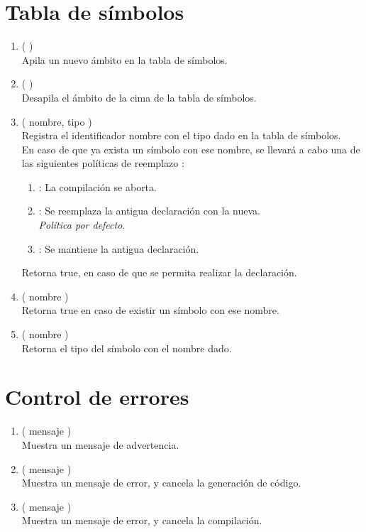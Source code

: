 \section{Tabla de símbolos}

\begin{enumerate}

	\item {} ( ) \\
			Apila un nuevo ámbito en la tabla de símbolos.
			
	\item {} ( ) \\
			Desapila el ámbito de la cima de la tabla de símbolos.

	\item {} ( nombre, tipo ) \\
			Registra el identificador nombre con el tipo dado en la tabla de símbolos.\\
			En caso de que ya exista un símbolo con ese nombre, se llevará a cabo una de las siguientes políticas de reemplazo :
				\begin{enumerate}
				
					\item {}: La compilación se aborta.
					
					\item {}: Se reemplaza la antigua declaración con la nueva. \\
						  \emph{Política por defecto}.
					
					\item {}: Se mantiene la antigua declaración.
					
				\end{enumerate}
			Retorna true, en caso de que se permita realizar la declaración.
					
	\item {} ( nombre ) \\
			Retorna true en caso de existir un símbolo con ese nombre.
				
	\item {} ( nombre ) \\
			Retorna el tipo del símbolo con el nombre dado.
	
\end{enumerate}

\section{Control de errores}

\begin{enumerate}
	\item {} ( mensaje ) \\
			Muestra un mensaje de advertencia.
			
	\item {} ( mensaje ) \\
			Muestra un mensaje de error, y cancela la generación de código.
	
	\item {} ( mensaje ) \\
			Muestra un mensaje de error, y cancela la compilación.
\end{enumerate}

